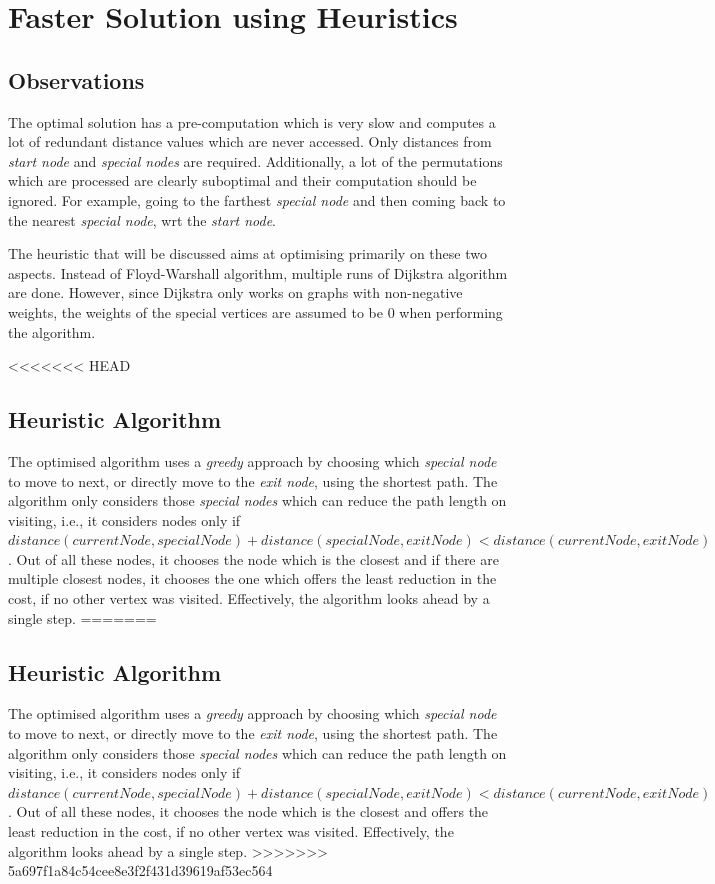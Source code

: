 \documentclass[12pt]{report}
\begin{document}
\chapter{Faster Solution using Heuristics}

\section{Observations}
The optimal solution has a pre-computation which is very slow and computes a lot of redundant distance values which are never accessed. Only distances from \textit{start node} and \textit{special nodes} are required. Additionally, a lot of the permutations which are processed are clearly suboptimal and their computation should be ignored. For example, going to the farthest \textit{special node} and then coming back to the nearest \textit{special node}, wrt the \textit{start node}.\par
The heuristic that will be discussed aims at optimising primarily on these two aspects. Instead of Floyd-Warshall algorithm, multiple runs of Dijkstra algorithm are done. However, since Dijkstra only works on graphs with non-negative weights, the weights of the special vertices are assumed to be $0$ when performing the algorithm.

<<<<<<< HEAD
\section{Heuristic Algorithm}
The optimised algorithm uses a \textit{greedy} approach by choosing which \textit{special node} to move to next, or directly move to the \textit{exit node}, using the shortest path. The algorithm only considers those \textit{special nodes} which can reduce the path length on visiting, i.e., it considers nodes only if ${distance}({currentNode}, {specialNode}) + {distance}({specialNode}, {exitNode}) < {distance}({currentNode}, {exitNode})$. Out of all these nodes, it chooses the node which is the closest and if there are multiple closest nodes, it chooses the one which offers the least reduction in the cost, if no other vertex was visited. Effectively, the algorithm looks ahead by a single step.
=======
\section{Heuristic Algorithm} %
The optimised algorithm uses a \textit{greedy} approach by choosing which \textit{special node} to move to next, or directly move to the \textit{exit node}, using the shortest path. The algorithm only considers those \textit{special nodes} which can reduce the path length on visiting, i.e., it considers nodes only if ${distance}({currentNode}, {specialNode}) + {distance}({specialNode}, {exitNode}) < {distance}({currentNode}, {exitNode})$. Out of all these nodes, it chooses the node which is the closest and offers the least reduction in the cost, if no other vertex was visited. Effectively, the algorithm looks ahead by a single step.
>>>>>>> 5a697f1a84c54cee8e3f2f431d39619af53ec564
\end{document}
